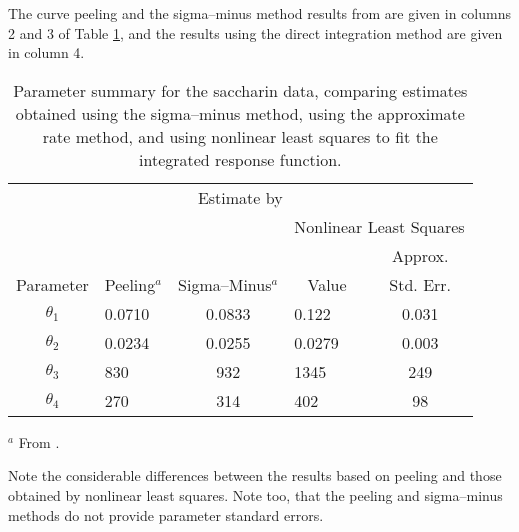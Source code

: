 \begin{example}
  The curve peeling and the sigma--minus method results from 
  are given in columns 2 and 3 of
  Table \ref{tbl:3}, and the
  results using the direct integration method are given in column 4.
  \begin{table}
    \caption{
      Parameter summary for the saccharin data, comparing estimates
      obtained using the sigma--minus method, using the approximate rate
      method, and using nonlinear least squares to fit the integrated
      response function.  }\label{tbl:3}
    \begin{center}
      \begin{tabular}{clclc} \hline
        \multicolumn{5}{c}{Estimate by}\\ & & &
        \multicolumn{2}{c}{Nonlinear Least Squares}\\ & & & &
        \multicolumn{1}{c}{Approx.}\\ \multicolumn{1}{c}{Parameter} &
        \multicolumn{1}{c}{Peeling$^{a}$} &
        \multicolumn{1}{c}{Sigma--Minus$^{a}$} & \multicolumn{1}{c}{Value}
        & \multicolumn{1}{c}{Std. Err.}\\ \hline
        $\theta_{1}$&0.0710&0.0833&0.122&0.031\\
        $\theta_{2}$&0.0234&0.0255&0.0279&0.003\\
        $\theta_{3}$&830&932&1345&249\\
        $\theta_{4}$&270&314&402&98\\
        \hline
      \end{tabular}
    \end{center}
     $^{a}$ From .
   \end{table}
  
  Note the considerable differences between the results based on
  peeling and those obtained by nonlinear least squares.
  Note too, that the peeling and sigma--minus methods do not
  provide parameter standard errors.
  

\end{example}
